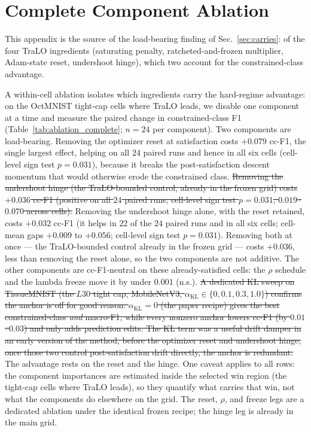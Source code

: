 \documentclass[10pt]{article}
\newcommand{\del}[1]{{\color{red}\sout{#1}}}
\begin{document}
\section{Complete Component Ablation}
\label{app:ablation}

This appendix is the source of the load-bearing finding of
Sec.~\ref{sec:carries}: of the four TraLO ingredients (saturating
penalty, ratcheted-and-frozen multiplier, Adam-state reset, undershoot
hinge), which two account for the constrained-class advantage.

A within-cell ablation isolates which ingredients carry the hard-regime
advantage: on the OctMNIST tight-cap cells where TraLO leads, we disable
one component at a time and measure the paired change in
constrained-class F1 (Table~\ref{tab:ablation_complete}; $n{=}24$ per
component). Two components are load-bearing. Removing the optimizer
reset at satisfaction costs $+0.079$ cc-F1, the single largest effect,
helping on all $24$ paired runs and hence in all six cells (cell-level
sign test $p\!=\!0.031$), because it breaks the post-satisfaction
descent momentum that would otherwise erode the constrained class.
\del{Removing the undershoot hinge (the TraLO-bounded control, already in
the frozen grid) costs \mbox{$+0.036$} cc-F1 (positive on all \mbox{$24$} paired
runs; cell-level sign test \mbox{$p\!=\!0.031$}; \mbox{$0.019$--$0.070$} across cells).}
{\color{blue}Removing the undershoot hinge alone, with the reset retained, costs
$+0.032$ cc-F1 (it helps in $22$ of the $24$ paired runs and in all six cells;
cell-mean gaps $+0.009$ to $+0.056$; cell-level sign test $p\!=\!0.031$). Removing
both at once --- the TraLO-bounded control already in the frozen grid --- costs
$+0.036$, less than removing the reset alone, so the two components are not additive.}
The other components are cc-F1-neutral on these already-satisfied
cells: the $\rho$ schedule and the lambda freeze move it by under $0.001$
(n.s.). \del{A dedicated KL sweep on TissueMNIST (the \mbox{$L30$} tight cap,
MobileNetV3, \mbox{$\alpha_{\mathrm{KL}}\!\in\!\{0,0.1,0.3,1.0\}$}) confirms the
anchor is off for good reason: \mbox{$\alpha_{\mathrm{KL}}{=}0$} (the paper
recipe) gives the best constrained-class \emph{and} macro-F1, while
every nonzero anchor lowers cc-F1 (by \mbox{$0.01$--$0.03$}) and only adds
prediction edits. The KL term was a useful drift damper in an early
version of the method, before the optimizer reset and undershoot hinge;
once those two control post-satisfaction drift directly, the anchor is
redundant.} The advantage rests on the reset and the hinge. One caveat
applies to all rows: the component importances are estimated inside the
selected win region (the tight-cap cells where TraLO leads), so they
quantify what carries that win, not what the components do elsewhere on
the grid. The reset, $\rho$, and freeze legs are a dedicated ablation
under the identical frozen recipe; the hinge leg is already in the main
grid.
\end{document}
